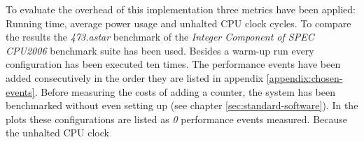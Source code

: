 \label{sec:overhead}

To evaluate the overhead of this implementation three metrics have been applied:
Running time, average power usage and unhalted CPU clock cycles. To compare the
results the \emph{473.astar} benchmark of the \emph{Integer Component of SPEC
CPU2006} benchmark suite has been used. Besides a warm-up run every
configuration has been executed ten times. The performance events have been
added consecutively in the order they are listed in appendix
\ref{appendix:chosen-events}. Before measuring the costs of adding a counter,
the system has been benchmarked without even setting up \JWTlibpfm{} (see
chapter \ref{sec:standard-software}). In the plots these configurations are
listed as \emph{0} performance events measured. Because the unhalted CPU clock
